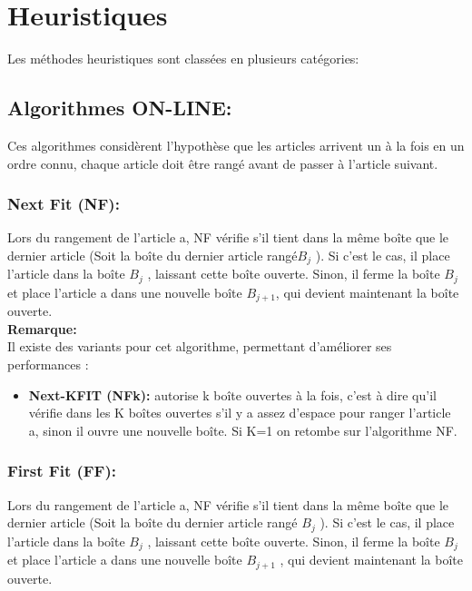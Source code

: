 \documentclass[class=report, crop=false]{standalone}
\begin{document}
        \section{Heuristiques}
        Les méthodes heuristiques  sont classées en plusieurs catégories:
        \subsection{Algorithmes ON-LINE:}
        Ces algorithmes considèrent l’hypothèse que les articles arrivent un à la fois en un ordre connu, chaque article doit être rangé avant de passer à l’article suivant.
        \subsubsection{Next Fit (NF):} Lors du rangement de l’article a, NF vérifie s'il tient dans la même boîte que le dernier article (Soit la boîte du dernier article rangé$B_j$ ). Si c’est le cas, il place l’article dans la boîte $B_j$ , laissant cette boîte ouverte. Sinon, il ferme la boîte $B_j$ et place l’article a dans une nouvelle boîte $B_{j+1}$, qui devient maintenant la boîte ouverte. 
        \\ \textbf{Remarque:} \\
        Il existe des variants pour cet algorithme, permettant d’améliorer ses performances : 
        \begin{itemize}
            \item \textbf{Next-KFIT (NFk): } autorise k boîte ouvertes à la fois, c’est à dire qu’il vérifie dans les K boîtes ouvertes s’il y a assez d’espace pour ranger l’article a, sinon il ouvre une nouvelle boîte. Si K=1 on retombe sur l’algorithme NF.
        \end{itemize}
        \subsubsection{First Fit (FF): } Lors du rangement de l’article a, NF vérifie s'il tient dans la même boîte que le dernier article (Soit la boîte du dernier article rangé $B_j$ ). Si c’est le cas, il place l’article dans la boîte $B_j$ , laissant cette boîte ouverte. Sinon, il ferme la boîte $B_j$ et place l’article a dans une nouvelle boîte $B_{j+1}$ , qui devient maintenant la boîte ouverte. 
\end{document}

